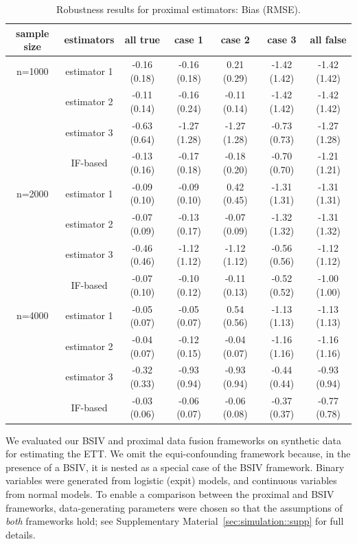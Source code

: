 \documentclass[10pt]{article}
\begin{document}
\begin{table}[t]
\centering
\begin{tabular}{c | c c c c c c} 
 \hline
 sample size & estimators & all true & case 1 & case 2 & case 3 & all false\\ [0.5ex] 
 \hline
n=1000 & estimator 1 & -0.16 (0.18)  & -0.16 (0.18) & 0.21 (0.29) & -1.42 (1.42) & -1.42 (1.42) \\
 & estimator 2 & -0.11 (0.14) & -0.16 (0.24) & -0.11 (0.14) & -1.42 (1.42) & -1.42 (1.42) \\
 & estimator 3 & -0.63 (0.64) & -1.27 (1.28) & -1.27 (1.28) & -0.73 (0.73) & -1.27 (1.28)\\
 & IF-based & -0.13 (0.16) & -0.17 (0.18) & -0.18 (0.20) & -0.70 (0.70) & -1.21 (1.21)\\
\hline
n=2000 & estimator 1 & -0.09 (0.10) & -0.09 (0.10) & 0.42 (0.45) & -1.31 (1.31) & -1.31 (1.31) \\
 & estimator 2 & -0.07 (0.09) & -0.13 (0.17) & -0.07 (0.09) & -1.32 (1.32) & -1.31 (1.32) \\
 & estimator 3 & -0.46 (0.46) & -1.12 (1.12) & -1.12 (1.12) & -0.56 (0.56) & -1.12 (1.12)\\
 & IF-based & -0.07 (0.10) & -0.10 (0.12) & -0.11 (0.13) & -0.52 (0.52) & -1.00 (1.00)\\
 \hline
 n=4000 & estimator 1 & -0.05 (0.07) & -0.05 (0.07) & 0.54 (0.56) & -1.13 (1.13) & -1.13 (1.13) \\
 & estimator 2 & -0.04 (0.07) & -0.12 (0.15) & -0.04 (0.07) & -1.16 (1.16) & -1.16 (1.16) \\
 & estimator 3 & -0.32 (0.33) & -0.93 (0.94) & -0.93 (0.94) & -0.44 (0.44) & -0.93 (0.94)\\
 & IF-based & -0.03 (0.06) & -0.06 (0.07) & -0.06 (0.08) & -0.37 (0.37) & -0.77 (0.78)\\
\hline
\end{tabular}
\caption{Robustness results for proximal estimators: Bias (RMSE).}
\label{proximal_robustness_table}
\end{table}

We evaluated our BSIV and proximal data fusion frameworks on synthetic data for estimating the ETT. We omit the equi-confounding framework because, in the presence of a BSIV, it is nested as a special case of the BSIV framework. Binary variables were generated from logistic (expit) models, and continuous variables from normal models. To enable a comparison between the proximal and BSIV frameworks, data-generating parameters were chosen so that the assumptions of \emph{both} frameworks hold; see Supplementary Material~\ref{sec:simulation::supp} for full details.
\end{document}
